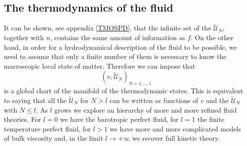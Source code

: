 \documentclass[useAMS,usenatbib,prd,twocolumn,nofootinbib]{revtex4-1}
\begin{document}
\subsection{The thermodynamics of the fluid}\label{ttotffrtr}

It can be shown, see appendix \ref{TMOSPD}, that the infinite set of the $\tilde{\mathcal{U}}_N$, together with $n$, contains the same amount of information as $f$. On the other hand, in order for a hydrodynamical description of the fluid to be possible, we need to assume that only a finite number of them is necessary to know the macroscopic local state of matter. Therefore we can impose that 
\begin{equation}\label{ilprimodeiptizi}
(v,\tilde{\mathcal{U}}_N)_{N=1,...,l}
\end{equation}
is a global chart of the manifold of the thermodynamic states. This is equivalent to saying that all the $\tilde{\mathcal{U}}_N$ for $N>l$ can be written as functions of $v$ and the $\tilde{\mathcal{U}}_N$ with $N \leq l$. As $l$ grows we explore an hierarchy of more and more refined fluid theories. For $l=0$ we have the barotropic perfect fluid, for $l=1$ the finite temperature perfect fluid, for $l>1$ we have more and more complicated models of bulk viscosity and, in the limit $l \longrightarrow +\infty$ we recover full kinetic theory. 
\end{document}
